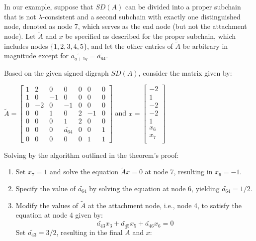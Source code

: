 	\begin{example}
		In our example, suppose that $SD(A)$ can be divided into a proper subchain that is not $\lambda$-consistent and a second subchain with exactly one distinguished node, denoted as node 7, which serves as the end node (but not the attachment node). Let $\tilde{A}$ and $x$ be specified as described for the proper subchain, which includes nodes $\{1,2,3,4,5\}$, and let the other entries of $\tilde{A}$ be arbitrary in magnitude except for $\tilde{a_{q+1q}}=\tilde{a_{64}}$.
		
		Based on the given signed digraph $SD(A)$, consider the matrix given by:
		\begin{center}
			$\tilde{A} = \begin{bmatrix}
				1 & 2 & 0 & 0 & 0 & 0 & 0\\
				1 & 0 & -1 & 0 & 0 & 0 & 0\\
				0 & -2 & 0 & -1 & 0 & 0 & 0 \\
				0 & 0 & 1 & 0 &2 & -1 & 0\\
				0 & 0 & 0 & 1 & 2 & 0 & 0\\
				0 & 0 & 0 &\tilde{a_{64}}&0 & 0 & 1\\
				0 & 0 & 0 & 0 &0 & 1 & 1
			\end{bmatrix}$
			and $x= \begin{bmatrix}
				-2\\
				1 \\
				-2\\
				-2\\
				1\\
				x_6\\
				x_7\\
			\end{bmatrix}$
		\end{center}
		
		Solving by the algorithm outlined in the theorem's proof:
		\begin{enumerate}
			\item Set $x_7=1$ and solve the equation $\tilde{A}x=0$ at node 7, resulting in $x_6=-1$.
			\item Specify the value of $\tilde{a_{64}}$ by solving the equation at node 6, yielding $\tilde{a_{64}} = 1/2$.
			\item Modify the values of $\tilde{A}$ at the attachment node, i.e., node 4, to satisfy the equation at node 4 given by:
			\[\tilde{a_{43}}x_{3} + \tilde{a_{45}}x_{5} + \tilde{a_{46}}x_{6} = 0\]
			Set $\tilde{a_{43}} = 3/2$, resulting in the final $\tilde{A}$ and $x$:
		\end{enumerate}
		

\end{example}

